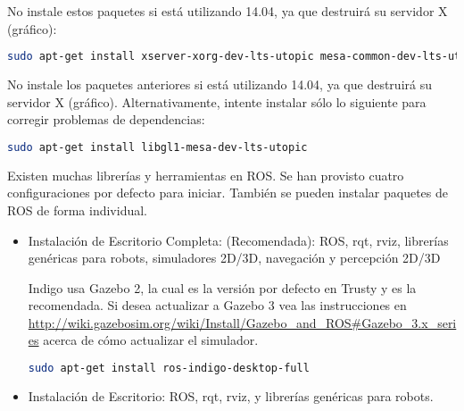 \begin{enumerate}
	\begin{redwarningbox}
	No instale estos paquetes si está utilizando 14.04, ya que destruirá su servidor X (gráfico):
	\end{redwarningbox}
	\begin{blackcodebox}
	\begin{lstlisting}[language=bash]
sudo apt-get install xserver-xorg-dev-lts-utopic mesa-common-dev-lts-utopic libxatracker-dev-lts-utopic libopenvg1-mesa-dev-lts-utopic libgles2-mesa-dev-lts-utopic libgles1-mesa-dev-lts-utopic libgl1-mesa-dev-lts-utopic libgbm-dev-lts-utopic libegl1-mesa-dev-lts-utopic
	\end{lstlisting}
	\end{blackcodebox}
	\begin{redwarningbox}
	No instale los paquetes anteriores si está utilizando 14.04, ya que destruirá su servidor X (gráfico). Alternativamente, intente instalar sólo lo siguiente para corregir problemas de dependencias:
	\end{redwarningbox}
	\begin{blackcodebox}
	\begin{lstlisting}[language=bash]
sudo apt-get install libgl1-mesa-dev-lts-utopic
	\end{lstlisting}
	\end{blackcodebox}

	Existen muchas librerías y herramientas en ROS. Se han provisto cuatro configuraciones por defecto para iniciar. También se pueden instalar paquetes de ROS de forma individual.

	\begin{itemize}
		\item Instalación de Escritorio Completa: (Recomendada): ROS, rqt, rviz, librerías genéricas para robots, simuladores 2D/3D, navegación y percepción 2D/3D

		Indigo usa Gazebo 2, la cual es la versión por defecto en Trusty y es la recomendada. Si desea actualizar a Gazebo 3 vea las instrucciones en \url{http://wiki.gazebosim.org/wiki/Install/Gazebo_and_ROS#Gazebo_3.x_series} acerca de cómo actualizar el simulador.


		\begin{blackcodebox}
		\begin{lstlisting}[language=bash]
sudo apt-get install ros-indigo-desktop-full
		\end{lstlisting}
		\end{blackcodebox}

		\item Instalación de Escritorio: ROS, rqt, rviz, y librerías genéricas para robots.


\end{itemize}
\end{enumerate}
